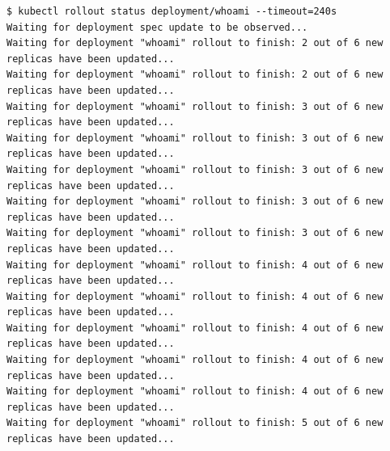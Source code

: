 \documentclass[11pt,a4paper]{article}
\begin{document}
\par\medskip\noindent\begin{minipage}{\linewidth}
\par\vspace{4pt}\noindent\begin{minipage}{\linewidth}
\begin{Verbatim}[breaklines=true,breakanywhere=true,fontsize=\footnotesize,frame=single,framesep=8pt,rulecolor=\color{teal}]
$ kubectl rollout status deployment/whoami --timeout=240s
Waiting for deployment spec update to be observed...
Waiting for deployment "whoami" rollout to finish: 2 out of 6 new replicas have been updated...
Waiting for deployment "whoami" rollout to finish: 2 out of 6 new replicas have been updated...
Waiting for deployment "whoami" rollout to finish: 3 out of 6 new replicas have been updated...
Waiting for deployment "whoami" rollout to finish: 3 out of 6 new replicas have been updated...
Waiting for deployment "whoami" rollout to finish: 3 out of 6 new replicas have been updated...
Waiting for deployment "whoami" rollout to finish: 3 out of 6 new replicas have been updated...
Waiting for deployment "whoami" rollout to finish: 3 out of 6 new replicas have been updated...
Waiting for deployment "whoami" rollout to finish: 4 out of 6 new replicas have been updated...
Waiting for deployment "whoami" rollout to finish: 4 out of 6 new replicas have been updated...
Waiting for deployment "whoami" rollout to finish: 4 out of 6 new replicas have been updated...
Waiting for deployment "whoami" rollout to finish: 4 out of 6 new replicas have been updated...
Waiting for deployment "whoami" rollout to finish: 4 out of 6 new replicas have been updated...
Waiting for deployment "whoami" rollout to finish: 5 out of 6 new replicas have been updated...
\end{Verbatim}
\end{minipage}\par\vspace{6pt}

\end{minipage}\par\medskip
\end{document}
